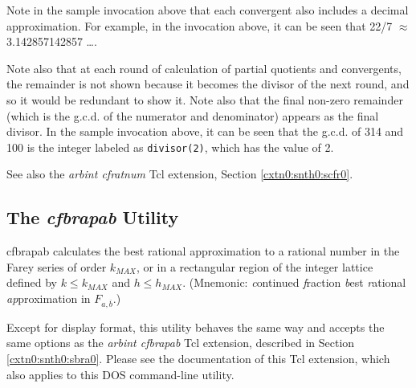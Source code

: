 \begin{dosutilcommandsampleinvocations}
Note in the sample invocation above that each convergent
also includes a decimal approximation.  For example,
in the invocation above, it can be seen that 
22/7 $\approx$ 3.142857142857 \ldots{}.

Note also that at each round of calculation of partial
quotients and convergents, the remainder is not shown because
it becomes the divisor of the next round, and so it would be
redundant to show it.  Note also that the final non-zero remainder
(which is the g.c.d. of the numerator and denominator) 
appears as the final divisor.  In the sample
invocation above, it can be seen that the g.c.d. of
314 and 100 is the integer labeled as 
\texttt{divisor(2)}, which has the value of 2.
\end{dosutilcommandsampleinvocations}

\begin{dosutilcommandseealso}
See also the \emph{arbint cfratnum} Tcl extension, 
Section \ref{cxtn0:snth0:scfr0}.
\end{dosutilcommandseealso}


\subsection{The \emph{cfbrapab} Utility}
\label{cdcm0:snth0:sbra0}

\begin{dosutilcommandname}{cfbrapab}%
calculates the best rational approximation to a
rational
number in the Farey series of order
$k_{MAX}$, or in a rectangular region of the integer lattice
defined by $k \leq k_{MAX}$ and $h \leq h_{MAX}$.
(Mnemonic:  \emph{c}ontinued
\emph{f}raction \emph{b}est \emph{r}ational \emph{ap}proximation
in $F_{a, \overline{b}}$.)
\end{dosutilcommandname}

\begin{dosutilcommanddescription}
Except for display format,
this utility behaves the same way and
accepts the same options as the \emph{arbint cfbrapab}
Tcl extension, described in Section \ref{cxtn0:snth0:sbra0}.
Please see the documentation of this Tcl extension, which also applies
to this DOS command-line utility.
\end{dosutilcommanddescription}



